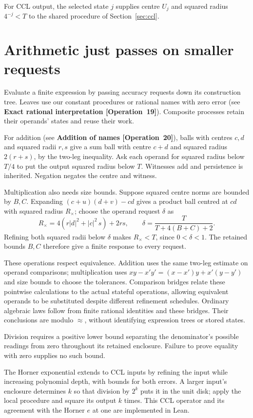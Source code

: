 \documentclass[11pt]{article}
\newcommand{\sq}[1]{\lvert #1\rvert^2}
\newcommand{\entryname}[3]{\textbf{#3 \mbox{[#1~#2]}}}
\begin{document}
For CCL output, the selected state $j$ supplies centre $U_j$ and squared
radius $4^{-j}<T$ to the shared procedure of Section~\ref{sec:ccl}.

\section{Arithmetic just passes on smaller requests}\label{sec:arithmetic}

Evaluate a finite expression by passing accuracy requests down its
construction tree. Leaves use our constant procedures or rational names
with zero error (see \entryname{Operation}{19}{Exact rational interpretation}).
Composite processes retain their operands' states
and reuse their work.

For addition (see \entryname{Operation}{20}{Addition of names}), balls with centres
$c,d$ and squared radii $r,s$ give a sum
ball with centre $c+d$ and squared radius $2(r+s)$, by the two-leg
inequality. Ask each operand for squared radius below $T/4$ to put the
output squared radius below $T$. Witnesses add and persistence is inherited.
Negation negates the centre and witness.

Multiplication also needs size bounds. Suppose squared centre norms are
bounded by $B,C$. Expanding $(c+u)(d+v)-cd$ gives a product ball centred
at $cd$ with squared radius $R_\times$; choose the operand request $\delta$ as
\[
 R_\times=4(r\sq d+\sq c\,s)+2rs,\qquad
 \delta=\frac{T}{T+4(B+C)+2}.
\]
Refining both squared radii below $\delta$ makes $R_\times<T$, since
$0<\delta<1$. The retained bounds $B,C$ therefore give a finite
response to every request.

These operations respect equivalence. Addition uses the same two-leg
estimate on operand comparisons; multiplication uses
$xy-x'y'=(x-x')y+x'(y-y')$ and size bounds to choose the tolerances.
Comparison bridges relate these pointwise calculations to the actual
stateful operations, allowing equivalent operands to be substituted despite
different refinement schedules. Ordinary algebraic laws follow from finite
rational identities and these bridges. Their conclusions are modulo
$\approx$, without identifying expression trees or stored states.

Division requires a positive lower bound separating the denominator's
possible readings from zero throughout its retained enclosure. Failure
to prove equality with zero supplies no such bound.

The Horner exponential extends to CCL inputs by refining the input while
increasing polynomial depth, with bounds for both errors. A larger input's
enclosure determines $k$ so that division by $2^k$ puts it in the unit disk;
apply the local procedure and square its output $k$ times. This CCL operator
and its agreement with the Horner $e$ at one are implemented in Lean.
\end{document}
